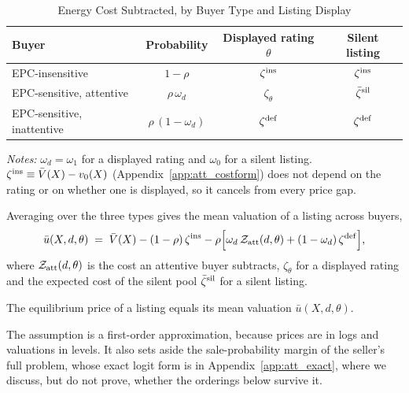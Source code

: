 \begin{table}[htbp]
\centering
\caption{Energy Cost Subtracted, by Buyer Type and Listing Display}
\label{tab:att_buyers}
\small\renewcommand{\arraystretch}{1.5}
\begin{tabular*}{\textwidth}{@{\extracolsep{\fill}}lccc@{}}
\toprule\toprule
\textbf{Buyer} & \textbf{Probability} & \textbf{Displayed rating $\theta$} & \textbf{Silent listing} \\
\midrule
EPC-insensitive & $1-\rho$ & $\zeta^{\rm ins}$ & $\zeta^{\rm ins}$ \\
EPC-sensitive, attentive & $\rho\,\omega_d$ & $\zeta_\theta$ & $\bar \zeta^{\rm sil}$ \\
EPC-sensitive, inattentive & $\rho\,(1-\omega_d)$ & $\zeta^{\rm def}$ & $\zeta^{\rm def}$ \\
\bottomrule\bottomrule
\end{tabular*}

\vspace{0.5em}
\raggedright
\footnotesize
\textit{Notes:} $\omega_d=\omega_1$ for a displayed rating and $\omega_0$ for a silent listing. $\zeta^{\rm ins}\equiv\bar V(X)-v_0(X)$ (Appendix~\ref{app:att_costform}) does not depend on the rating or on whether one is displayed, so it cancels from every price gap.
\end{table}

Averaging over the three types gives the mean valuation of a listing across buyers,
\begin{equation}
    \bar u(X,d,\theta)\;=\;\bar V(X)-(1-\rho)\,\zeta^{\rm ins}-\rho\Big[\omega_d\,\mathcal Z_{\rm att}(d,\theta)+(1-\omega_d)\,\zeta^{\rm def}\Big],
    \label{eq:mean_valuation}
\end{equation}
where $\mathcal Z_{\rm att}(d,\theta)$ is the cost an attentive buyer subtracts, $\zeta_\theta$ for a displayed rating and the expected cost of the silent pool $\bar\zeta^{\rm sil}$ for a silent listing.

\begin{assumption}
\label{assum:linear_pricing}
The equilibrium price of a listing equals its mean valuation $\bar u(X,d,\theta)$.
\end{assumption}

\noindent The assumption is a first-order approximation, because prices are in logs and valuations in levels. It also sets aside the sale-probability margin of the seller's full problem, whose exact logit form is in Appendix~\ref{app:att_exact}, where we discuss, but do not prove, whether the orderings below survive it.

